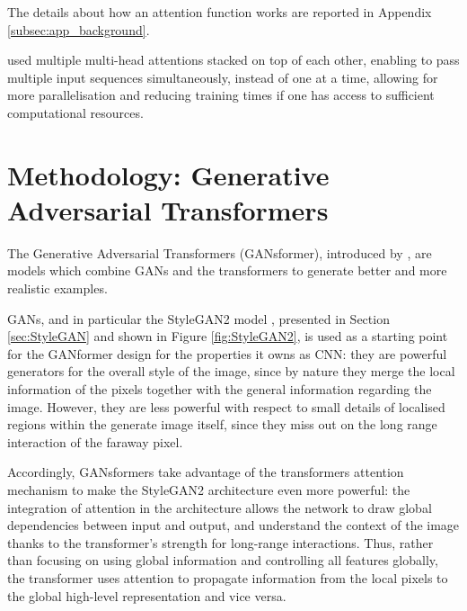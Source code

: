 \documentclass{article}
\begin{document}
	The details about how an attention function works are reported in Appendix 
	\ref{subsec:app_background}. 
	
	\citet{vaswani2017attention}used multiple multi-head attentions stacked on top of each other, enabling to pass multiple input sequences simultaneously, instead of one at a time, allowing for more parallelisation and reducing training times if one has access to sufficient computational resources.
	
	\section{Methodology: Generative Adversarial Transformers}\label{sec:ganformer}
	
	The Generative Adversarial Transformers (GANsformer), introduced by 
	\citet{hudson2021generative}, are models which combine GANs and the transformers to 
	generate 
	better and more realistic examples.
	
	GANs, and in particular the StyleGAN2 model \cite{karras2020analyzing}, presented in Section 
	\ref{sec:StyleGAN} and shown in Figure \ref{fig:StyleGAN2}, is used as a starting point for the 
	GANformer design for the properties it owns as CNN: they are powerful generators for the overall 
	style of the image, since by nature they merge the local information of the pixels together with the 
	general information regarding the image. 
	However, they are less powerful with respect to small details of localised regions within the 
	generate 
	image itself, since they miss out on the long range interaction of the faraway pixel.
	
	Accordingly, GANsformers take advantage of the transformers attention mechanism to make the 
	StyleGAN2 architecture even more powerful: the integration of attention in the architecture allows 
	the network to draw global dependencies between input and output, and understand the context of 
	the image thanks to the transformer's strength for long-range interactions.
	Thus, rather than focusing on using global information and controlling all features globally, 
	the transformer uses attention to propagate information from the local pixels to the global high-level 
	representation and vice versa. 
	
\end{document}
